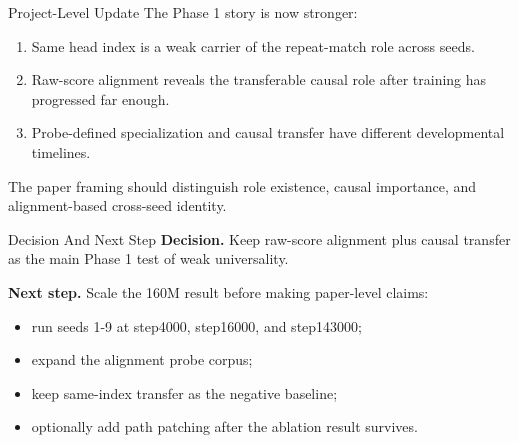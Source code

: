 \documentclass[aspectratio=169]{beamer}
\begin{document}
\begin{frame}{Project-Level Update}
  The Phase 1 story is now stronger:

  \begin{enumerate}
    \item Same head index is a weak carrier of the repeat-match role across
    seeds.
    \item Raw-score alignment reveals the transferable causal role after
    training has progressed far enough.
    \item Probe-defined specialization and causal transfer have different
    developmental timelines.
  \end{enumerate}

  \vspace{0.8em}
  The paper framing should distinguish role existence, causal importance, and
  alignment-based cross-seed identity.
\end{frame}

\begin{frame}{Decision And Next Step}
  \textbf{Decision.} Keep raw-score alignment plus causal transfer as the main
  Phase 1 test of weak universality.

  \vspace{0.8em}
  \textbf{Next step.}
  Scale the 160M result before making paper-level claims:

  \begin{itemize}
    \item run seeds 1-9 at step4000, step16000, and step143000;
    \item expand the alignment probe corpus;
    \item keep same-index transfer as the negative baseline;
    \item optionally add path patching after the ablation result survives.
  \end{itemize}
\end{frame}
\end{document}
